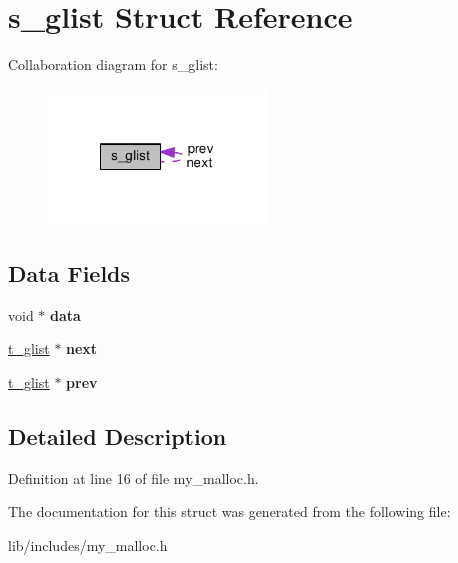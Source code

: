 \hypertarget{structs__glist}{\section{s\-\_\-glist Struct Reference}
\label{structs__glist}
}


Collaboration diagram for s\-\_\-glist\-:
\nopagebreak
\begin{figure}[H]
\begin{center}
\leavevmode
\includegraphics[width=165pt]{structs__glist__coll__graph}
\end{center}
\end{figure}
\subsection*{Data Fields}
\begin{DoxyCompactItemize}
\item 
\hypertarget{structs__glist_a735984d41155bc1032e09bece8f8d66d}{void $\ast$ {\bfseries data}}\label{structs__glist_a735984d41155bc1032e09bece8f8d66d}

\item 
\hypertarget{structs__glist_a20c22490f3a95677fd45a335958ea5da}{\hyperlink{structs__glist}{t\-\_\-glist} $\ast$ {\bfseries next}}\label{structs__glist_a20c22490f3a95677fd45a335958ea5da}

\item 
\hypertarget{structs__glist_a3d44f907f8e9a16abd22ce7aa098a912}{\hyperlink{structs__glist}{t\-\_\-glist} $\ast$ {\bfseries prev}}\label{structs__glist_a3d44f907f8e9a16abd22ce7aa098a912}

\end{DoxyCompactItemize}


\subsection{Detailed Description}


Definition at line 16 of file my\-\_\-malloc.\-h.



The documentation for this struct was generated from the following file\-:\begin{DoxyCompactItemize}
\item 
lib/includes/my\-\_\-malloc.\-h\end{DoxyCompactItemize}
